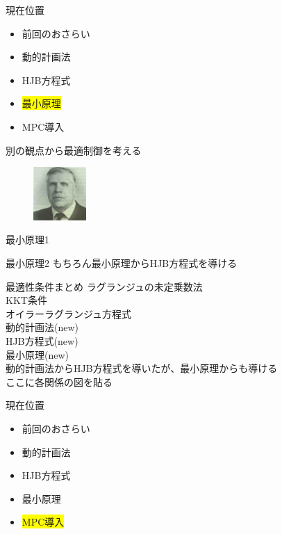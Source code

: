 \documentclass[dvipdfmx,12pt]{beamer}
\begin{document}
    \begin{frame}{現在位置}
        \footnotesize
        \begin{itemize}
            \item 前回のおさらい
            \item 動的計画法
            \item HJB方程式
            \item \colorbox{yellow}{最小原理}
            \item MPC導入
        \end{itemize}
        別の観点から最適制御を考える \\
        \begin{figure}[H]
            \includegraphics[clip, width = 2.0cm]{Pontryagin.png}
        \end{figure}
        \tiny{
        }
    \end{frame}

    \begin{frame}{最小原理1}
        \footnotesize

    \end{frame}

    \begin{frame}{最小原理2}
        \footnotesize
        もちろん最小原理からHJB方程式を導ける

    \end{frame}

    \begin{frame}{最適性条件まとめ}
        \footnotesize
        ラグランジュの未定乗数法\\
        KKT条件\\
        オイラーラグランジュ方程式\\
        動的計画法(new)\\
        HJB方程式(new)\\
        最小原理(new)\\
        動的計画法からHJB方程式を導いたが、最小原理からも導ける\\

        ここに各関係の図を貼る
    \end{frame}
    \begin{frame}{現在位置}
        \footnotesize
        \begin{itemize}
            \item 前回のおさらい
            \item 動的計画法
            \item HJB方程式
            \item 最小原理
            \item \colorbox{yellow}{MPC導入}
        \end{itemize}
    \end{frame}
\end{document}
